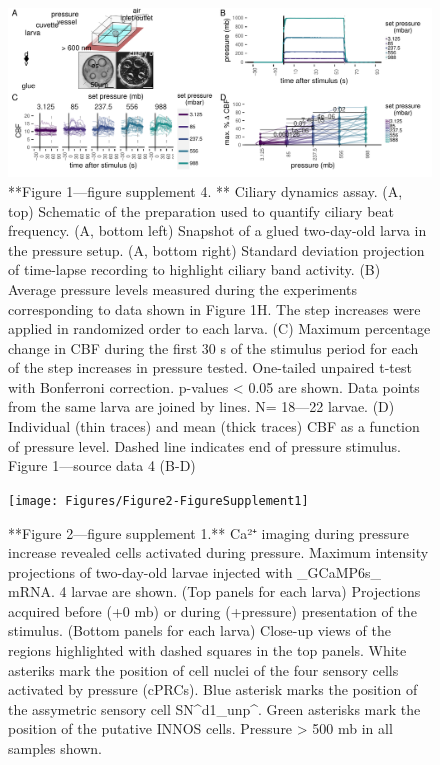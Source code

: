 \documentclass[
]{article}
\begin{document}
\begin{figure}
\includegraphics[width=34.72in]{Figures/Figure1-FigureSupplement4} \caption{**Figure 1—figure supplement 4. ** Ciliary dynamics assay. (A, top) Schematic of the preparation used to quantify ciliary beat frequency. (A, bottom left) Snapshot of a glued two-day-old larva in the pressure setup. (A, bottom right) Standard deviation projection of time-lapse recording to highlight ciliary band activity. (B) Average pressure levels measured during the experiments corresponding to data shown in Figure 1H. The step increases were applied in randomized order to each larva. (C) Maximum percentage change in CBF during the first 30 s of the stimulus period for each of the step increases in pressure tested. One-tailed unpaired t-test with Bonferroni correction. p-values < 0.05 are shown. Data points from the same larva are joined by lines. N= 18—22 larvae. (D) Individual (thin traces) and mean (thick traces) CBF as a function of pressure level. Dashed line indicates end of pressure stimulus. Figure 1---source data 4 (B-D)}\label{fig:unnamed-chunk-10}
\end{figure}

\begin{figure}
\texttt{[image: Figures/Figure2-FigureSupplement1]} \caption{**Figure 2—figure supplement 1.** Ca²⁺ imaging during pressure increase revealed cells activated during pressure. Maximum intensity projections of two-day-old larvae injected with _GCaMP6s_ mRNA. 4 larvae are shown. (Top panels for each larva) Projections acquired before (+0 mb) or during (+pressure) presentation of the stimulus. (Bottom panels for each larva)  Close-up views of the regions highlighted with dashed squares in the top panels. White asteriks mark the position of cell nuclei of the four sensory cells activated by pressure (cPRCs). Blue asterisk marks the position of the assymetric sensory cell SN^d1_unp^. Green asterisks mark the position of the putative INNOS cells. Pressure > 500 mb in all samples shown.}\label{fig:unnamed-chunk-11}
\end{figure}
\end{document}
